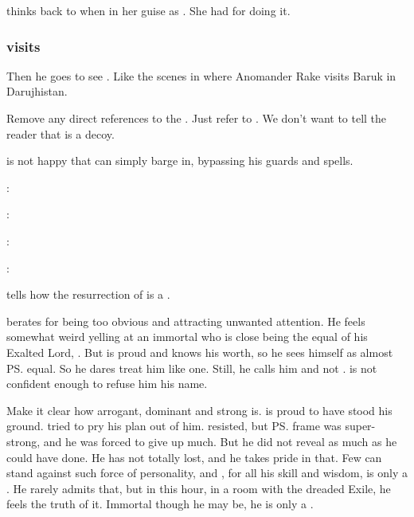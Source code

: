\Nzessuacrith{} thinks back to when  in her guise as \Takestsha. 
She had  for doing it. 





\subsubsection{\Ishnaruchaefir visits \Psyrex}
Then he goes to see \Psyrex. 
Like the scenes in \cite{StevenErikson:GardensoftheMoon} where Anomander Rake visits Baruk in Darujhistan. 

Remove any direct references to the \Malcur \nexus. 
Just refer to . 
We don't want to tell the reader that \Forclin{} is a decoy. 

\Psyrex{} is not happy that \Ishnaruchaefir{} can simply barge in, bypassing his guards and spells. 

\begin{prose}
  \Ishnaruchaefir: 
  
  \Psyrex: 
  
  \Ishnaruchaefir: 
  
  \Psyrex: 
\end{prose}


\Psyrex{} tells how the resurrection of \Nithdornazsh{} is a .  

\Psyrex{} berates \Ishnaruchaefir{} for being too obvious and attracting unwanted attention. 
He feels somewhat weird yelling at an immortal who is close being the equal of his Exalted Lord, \Secherdamon. 
But \Psyrex{} is proud and knows his worth, so he sees himself as almost \ps{\Ishnaruchaefir} equal. 
So he dares treat him like one. 
Still, he calls him \quo{\Ishnaruchaefir} and not . 
\Psyrex{} is not confident enough to refuse him his name. 

Make it clear how arrogant, dominant and strong \QuessanthIshnaruchaefir{} is. 
\Psyrex{} is proud to have stood his ground. 
\Ishnaruchaefir{} tried to pry his plan out of him.
\Psyrex{} resisted, but \ps{\Ishnaruchaefir} frame was super-strong, and he was forced to give up much.
But he did not reveal as much as he could have done. 
He has not totally lost, and he takes pride in that. 
Few can stand against such force of personality, and \Psyrex, for all his skill and wisdom, is only a \scatha. 
He rarely admits that, but in this hour, in a room with the dreaded Exile, he feels the truth of it.
Immortal though he may be, he is only a \scatha. 

